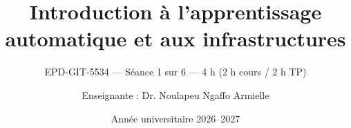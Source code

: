 
\title[EPD-GIT-5534 --- Séance 1]{Introduction à l'apprentissage automatique et aux infrastructures}
\subtitle{EPD-GIT-5534 --- Séance 1 sur 6 --- 4 h (2 h cours / 2 h TP)}
\author{Enseignante : Dr. Noulapeu Ngaffo Armielle}
\date{Année universitaire 2026--2027}







